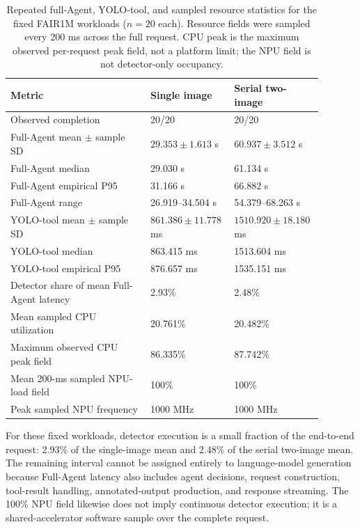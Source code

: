 \begin{table}[htbp]
\centering
\small
\renewcommand{\arraystretch}{1.12}
\setlength{\tabcolsep}{4pt}
\caption{Repeated full-Agent, YOLO-tool, and sampled resource statistics for the fixed FAIR1M workloads ($n=20$ each). Resource fields were sampled every 200 ms across the full request. CPU peak is the maximum observed per-request peak field, not a platform limit; the NPU field is not detector-only occupancy.}
\label{tab:agent_runtime_resource}
\begin{tabular}{p{0.43\linewidth}p{0.23\linewidth}p{0.23\linewidth}}
\toprule
\rowcolor{gray!12}
\textbf{Metric} & \textbf{Single image} & \textbf{Serial two-image} \\
\midrule
Observed completion & 20/20 & 20/20 \\
\rowcolor{graybg}
Full-Agent mean $\pm$ sample SD & $29.353 \pm 1.613$ s & $60.937 \pm 3.512$ s \\
Full-Agent median & 29.030 s & 61.134 s \\
\rowcolor{graybg}
Full-Agent empirical P95 & 31.166 s & 66.882 s \\
Full-Agent range & 26.919--34.504 s & 54.379--68.263 s \\
\rowcolor{graybg}
YOLO-tool mean $\pm$ sample SD & $861.386 \pm 11.778$ ms & $1510.920 \pm 18.180$ ms \\
YOLO-tool median & 863.415 ms & 1513.604 ms \\
\rowcolor{graybg}
YOLO-tool empirical P95 & 876.657 ms & 1535.151 ms \\
Detector share of mean Full-Agent latency & 2.93\% & 2.48\% \\
\rowcolor{graybg}
Mean sampled CPU utilization & 20.761\% & 20.482\% \\
Maximum observed CPU peak field & 86.335\% & 87.742\% \\
\rowcolor{graybg}
Mean 200-ms sampled NPU-load field & 100\% & 100\% \\
Peak sampled NPU frequency & 1000 MHz & 1000 MHz \\
\bottomrule
\end{tabular}
\end{table}

For these fixed workloads, detector execution is a small fraction of the end-to-end request: 2.93\% of the single-image mean and 2.48\% of the serial two-image mean. The remaining interval cannot be assigned entirely to language-model generation because Full-Agent latency also includes agent decisions, request construction, tool-result handling, annotated-output production, and response streaming. The 100\% NPU field likewise does not imply continuous detector execution; it is a shared-accelerator software sample over the complete request.


